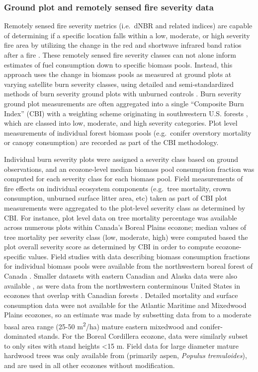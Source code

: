 \documentclass[, manuscript]{copernicus}
\begin{document}
\subsubsection{Ground plot and remotely sensed fire severity data}

Remotely sensed fire severity metrics (i.e.~dNBR and related indices)
are capable of determining if a specific location falls within a low,
moderate, or high severity fire area \citep{hall2008} by utilizing the
change in the red and shortwave infrared band ratios after a fire
\citep{key2006}. These remotely sensed fire severity classes can not
alone inform estimates of fuel consumption down to specific biomass
pools. Instead, this approach uses the change in biomass pools as
measured at ground plots at varying satellite burn severity classes,
using detailed and semi-standardized methods of burn severity ground
plots with unburned controls
\citep[e.g.][]{cockeComparisonBurnSeverity2005, hall2008}. Burn severity
ground plot measurements are often aggregated into a single ``Composite
Burn Index'' (CBI) with a weighting scheme originating in southwestern
U.S. forests
\citep{keyLandscapeAssessment2006, parksGivingEcologicalMeaning2019},
which are classed into low, moderate, and high severity categories. Plot
level measurements of individual forest biomass pools (e.g.~conifer
overstory mortality or canopy consumption) are recorded as part of the
CBI methodology.

Individual burn severity plots were assigned a severity class based on
ground observations, and an ecozone-level median biomass pool
consumption fraction was computed for each severity class for each
biomass pool. Field measurements of fire effects on individual ecosystem
components (e.g.~tree mortality, crown consumption, unburned surface
litter area, etc) taken as part of CBI plot measurements were aggregated
to the plot-level severity class as determined by CBI. For instance,
plot level data on tree mortality percentage was available across
numerous plots within Canada's Boreal Plains ecozone; median values of
tree mortality per severity class (low, moderate, high) were computed
based the plot overall severity score as determined by CBI in order to
compute ecozone-specific values. Field studies with data describing
biomass consumption fractions for individual biomass pools were
available from the northwestern boreal forest of Canada
\citep{french2020, whitman2018}. Smaller datasets with eastern Canadian
and Alaska data were also available
\citep{parksGivingEcologicalMeaning2019}, as were data from the
northwestern conterminous United States in ecozones that overlap with
Canadian forests \citep{saberi2022}. Detailed mortality and surface
consumption data were not available for the Atlantic Maritime and
Mixedwood Plains ecozones, so an estimate was made by subsetting data
from \citet{saberi2022} to a moderate basal area range (25-50
m\textsuperscript{2}/ha) mature eastern mixedwood and conifer-dominated
stands. For the Boreal Cordillera ecozone, data were similarly subset to
only sites with stand heights \textless15 m. Field data for large
diameter mature hardwood trees was only available from
\citet{whitman2018} (primarily aspen, \emph{Populus tremuloides}), and
are used in all other ecozones without modification.
\end{document}
